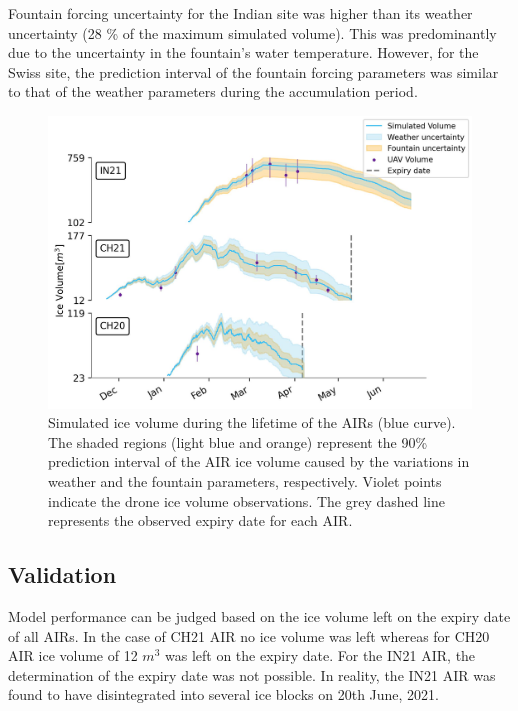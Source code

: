 \documentclass[utf8]{frontiersSCNS}
\begin{document}
Fountain forcing uncertainty for the Indian site was higher than its weather uncertainty (28 \% of the maximum
simulated volume). This was predominantly due to the uncertainty in the fountain's water temperature. However,
for the Swiss site, the prediction interval of the fountain forcing parameters was similar to that of the
weather parameters during the accumulation period. 

\begin{figure}
	\begin{center}
		\includegraphics[width=\linewidth]{Figures/Figure_6.jpg}
	\end{center}
	\caption{Simulated ice volume during the lifetime of the AIRs (blue curve). The shaded regions (light blue and
		orange) represent the 90\% prediction interval of the AIR ice volume caused by the variations in weather and
    the fountain parameters, respectively. Violet points indicate the drone ice volume observations.  The grey
  dashed line represents the observed expiry date for each AIR.  }
	\label{fig:results}
\end{figure}

\subsection{Validation}

Model performance can be judged based on the ice volume left on the expiry date of all AIRs. In the case of CH21
AIR no ice volume was left whereas for CH20 AIR ice volume of 12 $m^3$ was left on the expiry date. For the IN21
AIR, the determination of the expiry date was not possible. In reality, the IN21 AIR was found to have
disintegrated into several ice blocks on 20th June, 2021. 
\end{document}
